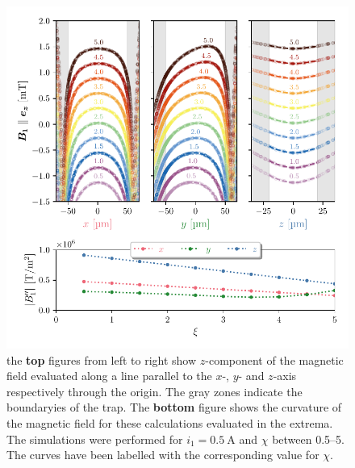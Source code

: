 \begin{figure}
    \centering
    \includegraphics{figures/data/magnetic_field_curvature.pdf}
    \caption{the \textbf{top} figures from left to right show $z$-component of the magnetic field evaluated along a line parallel to the $x$-, $y$- and $z$-axis respectively through the origin. The gray zones indicate the boundaryies of the trap. The \textbf{bottom} figure shows the curvature of the magnetic field for these calculations evaluated in the extrema. The simulations were performed for $i_1=\qty{0.5}{\ampere}$ and $\chi$ between \numrange{0.5}{5}. The curves have been labelled with the corresponding value for $\chi$.}
    \label{fig:magnetic-field-curvature}
\end{figure}

